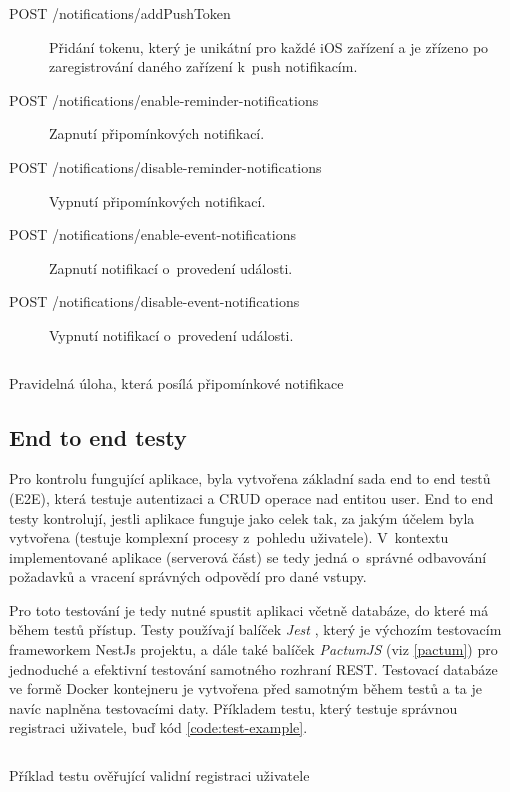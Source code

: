 \documentclass[thesis=M,czech]{FITthesis}[2019/12/23]
\begin{document}
\begin{description}
    \item[POST /notifications/addPushToken] Přidání  tokenu, který je unikátní pro každé iOS zařízení a je zřízeno po zaregistrování daného zařízení k~push notifikacím.
    \item[POST /notifications/enable-reminder-notifications] Zapnutí připomínkových notifikací.
    \item[POST /notifications/disable-reminder-notifications] Vypnutí připomínkových notifikací.
    \item[POST /notifications/enable-event-notifications] Zapnutí notifikací o~provedení události.
    \item[POST /notifications/disable-event-notifications] Vypnutí notifikací o~provedení události.
\end{description}

\begin{listing}
    \inputminted{javascript}{code/notifications-cron.txt}
    \caption{Pravidelná úloha, která posílá připomínkové notifikace}
    \label{code:notification-cron}
\end{listing}

\subsection{End to end testy}
Pro kontrolu fungující aplikace, byla vytvořena základní sada end to end testů (E2E), která testuje autentizaci a CRUD operace nad entitou user. End to end testy kontrolují, jestli aplikace funguje jako celek tak, za jakým účelem byla vytvořena (testuje komplexní procesy z~pohledu uživatele). V~kontextu implementované aplikace (serverová část) se tedy jedná o~správné odbavování požadavků a vracení správných odpovědí pro dané vstupy.

Pro toto testování je tedy nutné spustit aplikaci včetně databáze, do které má během testů přístup. Testy používají balíček \textit{Jest} \cite{jest}, který je výchozím testovacím frameworkem NestJs projektu, a dále také balíček \textit{PactumJS} (viz \ref{pactum}) pro jednoduché a efektivní testování samotného rozhraní REST. Testovací databáze ve formě Docker kontejneru je vytvořena před samotným během testů a ta je navíc naplněna testovacími daty. Příkladem testu, který testuje správnou registraci uživatele, buď kód \ref{code:test-example}.

\begin{listing}
    \inputminted{javascript}{code/test-example.txt}
    \caption{Příklad testu ověřující validní registraci uživatele}
    \label{code:test-example}
\end{listing}
\end{document}
